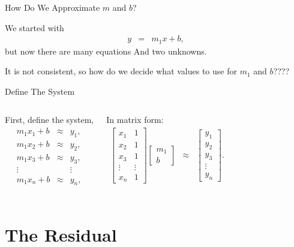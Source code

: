 \documentclass[svgnames,table,,aspectratio=169]{beamer}
\newcommand{\columnVector}[1]{%
  \left[
    \begin{array}{r}
    #1                           
    \end{array}
  \right]
}
\begin{document}
\begin{frame}{How Do We Approximate $m$ and $b$?}
 
  We started with
  \begin{eqnarray*}
    y & = & m_1 x + b,
  \end{eqnarray*}
  but now there are many equations And two unknowns.

  It is not consistent, so how do we decide what values to use for
  $m_1$ and $b$????

  \vfill
  
\end{frame}

\begin{frame}{Define The System}

  \begin{columns}
    First, define the system,
    \begin{eqnarray*}
      m_1 x_1 + b & \approx & y_1, \\
      m_1 x_2 + b & \approx & y_2, \\
      m_1 x_3 + b & \approx & y_3, \\
      \vdots & & \vdots \\
      m_1 x_n + b & \approx & y_n, \\
    \end{eqnarray*}

    In matrix form:
    \begin{eqnarray*}
      \left[
      \begin{array}{rr}
        x_1 & 1 \\
        x_2 & 1 \\
        x_3 & 1 \\
        \vdots & \vdots \\
        x_n & 1
      \end{array}
              \right]
              \columnVector{m_1 \\ b}
            & \approx &
                  \columnVector{y_1 \\ y_2 \\ y_3 \\ \vdots \\ y_n}.
    \end{eqnarray*}
  \end{columns}
\end{frame}


\section{The Residual}
\end{document}
